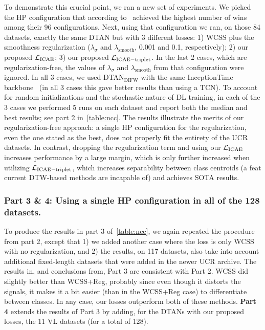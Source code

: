 To demonstrate this crucial point, we ran a new set of experiments. 
We picked the HP configuration 
that according to~\cite{Martinez:ICML:2022:closed}
achieved the highest number of wins among their 96 configurations.  
Next, using that configuration we ran,  on those 84 datasets, exactly the same DTAN but with 3 different losses:
1) WCSS plus the smoothness regularization ($\lambda_{\sigma}$ and $\lambda_{\mathrm{smooth}}$, 0.001 and 0.1, respectively);
2) our proposed $\mathcal{L}_{\mathrm{ICAE}}$;
3) our proposed $\mathcal{L}_{\mathrm{ICAE-triplet}}$.
In the last 2 cases, which are regularization-free, 
the values of $\lambda_{\sigma}$ and $\lambda_{\mathrm{smooth}}$ from that configuration were ignored. 
In all 3 cases, we used DTAN$_{\mathrm{DIFW}}$
with the same InceptionTime backbone~\cite{Ignacio:tsai} (in all 3 cases this gave better results than using a TCN). 
To account for random initializations and the stochastic nature of 
DL training,
in each of the 3 cases we performed 5 runs on each dataset and report both the median and best results;
see part 2 in~\autoref{table:ncc}.
The results illustrate the merits of our regularization-free approach:
a single HP configuration for the regularization, even the one stated as the best, does not properly fit the entirety of the UCR datasets. 
In contrast, dropping the regularization term and using our $\mathcal{L}_{\mathrm{ICAE}}$ increases performance by a large margin, which is only further increased when utilizing $\mathcal{L}_{\mathrm{ICAE-triplet}}$, 
which increases separability between class centroids (a feat current DTW-based methods are incapable of) and achieves SOTA results. 

\subsubsection{Part 3 \& 4: Using a single HP configuration in all of the 128 datasets.}
To produce the results in part 3 of~\autoref{table:ncc}, we again repeated the procedure from part 2, 
except that 1) we added another case where the loss is only WCSS with no regularization,
and 2) the results, on 117 datasets, also take into account additional fixed-length datasets that were added
in the newer UCR archive. 
The results in, and conclusions from,  Part 3 are consistent with Part 2. WCSS did slightly better than WCSS+Reg, probably since even though it distorts the signals, it makes it a bit easier (than in the WCSS+Reg case) to differentiate between classes. In any case, our losses outperform both of these methods. \textbf{Part 4} extends the results of Part 3 by adding, for the DTANs with our proposed losses, the 11 VL datasets (for a total of 128). 

